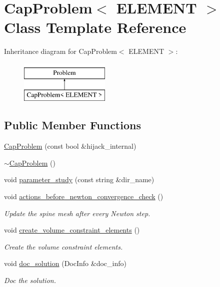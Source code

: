 \hypertarget{classCapProblem}{}\section{Cap\+Problem$<$ E\+L\+E\+M\+E\+NT $>$ Class Template Reference}
\label{classCapProblem}
Inheritance diagram for Cap\+Problem$<$ E\+L\+E\+M\+E\+NT $>$\+:\begin{figure}[H]
\begin{center}
\leavevmode
\includegraphics[height=2.000000cm]{classCapProblem}
\end{center}
\end{figure}
\subsection*{Public Member Functions}
\begin{DoxyCompactItemize}
\item 
\hyperlink{classCapProblem_ab03ed8e2c1b44911d11209e00cb28a42}{Cap\+Problem} (const bool \&hijack\+\_\+internal)
\item 
\hyperlink{classCapProblem_ad2b434212ecb33467359aef1071bc964}{$\sim$\+Cap\+Problem} ()
\item 
void \hyperlink{classCapProblem_af54251f12b42b85c6caf88e5214f45da}{parameter\+\_\+study} (const string \&dir\+\_\+name)
\item 
void \hyperlink{classCapProblem_ac852570b51489f4bf744b6063fbfa01a}{actions\+\_\+before\+\_\+newton\+\_\+convergence\+\_\+check} ()
\begin{DoxyCompactList}\small\item\em Update the spine mesh after every Newton step. \end{DoxyCompactList}\item 
void \hyperlink{classCapProblem_aa3a891fe6f5fc5fb5829e3bf636eda2c}{create\+\_\+volume\+\_\+constraint\+\_\+elements} ()
\begin{DoxyCompactList}\small\item\em Create the volume constraint elements. \end{DoxyCompactList}\item 
void \hyperlink{classCapProblem_a8549ca722d2d151ebf3ef7b35b925fbb}{doc\+\_\+solution} (Doc\+Info \&doc\+\_\+info)
\begin{DoxyCompactList}\small\item\em Doc the solution. \end{DoxyCompactList}\end{DoxyCompactItemize}
